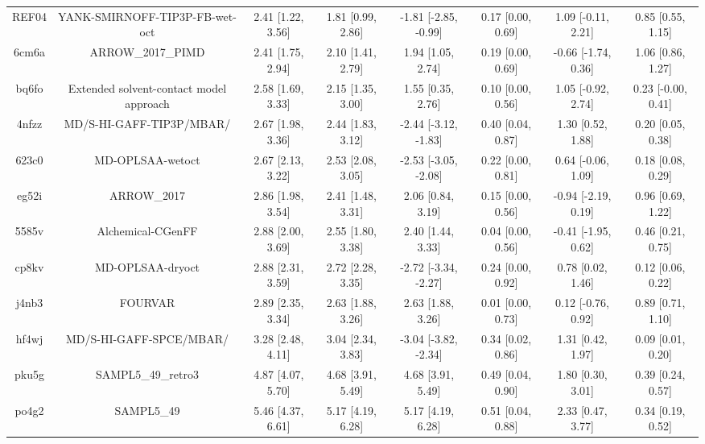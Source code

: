 \documentclass{article}
\begin{document}
\begin{center}
\begin{longtable}{|cccccccc|}
 REF04 &                     YANK-SMIRNOFF-TIP3P-FB-wet-oct &  2.41 [1.22, 3.56] &  1.81 [0.99, 2.86] &  -1.81 [-2.85, -0.99] &  0.17 [0.00, 0.69] &   1.09 [-0.11, 2.21] &     0.85 [0.55, 1.15] \\
 6cm6a &                                  ARROW\_2017\_PIMD &  2.41 [1.75, 2.94] &  2.10 [1.41, 2.79] &     1.94 [1.05, 2.74] &  0.19 [0.00, 0.69] &  -0.66 [-1.74, 0.36] &     1.06 [0.86, 1.27] \\
 bq6fo &            Extended solvent-contact model approach &  2.58 [1.69, 3.33] &  2.15 [1.35, 3.00] &     1.55 [0.35, 2.76] &  0.10 [0.00, 0.56] &   1.05 [-0.92, 2.74] &    0.23 [-0.00, 0.41] \\
 4nfzz &                           MD/S-HI-GAFF-TIP3P/MBAR/ &  2.67 [1.98, 3.36] &  2.44 [1.83, 3.12] &  -2.44 [-3.12, -1.83] &  0.40 [0.04, 0.87] &    1.30 [0.52, 1.88] &     0.20 [0.05, 0.38] \\
 623c0 &                                   MD-OPLSAA-wetoct &  2.67 [2.13, 3.22] &  2.53 [2.08, 3.05] &  -2.53 [-3.05, -2.08] &  0.22 [0.00, 0.81] &   0.64 [-0.06, 1.09] &     0.18 [0.08, 0.29] \\
 eg52i &                                        ARROW\_2017 &  2.86 [1.98, 3.54] &  2.41 [1.48, 3.31] &     2.06 [0.84, 3.19] &  0.15 [0.00, 0.56] &  -0.94 [-2.19, 0.19] &     0.96 [0.69, 1.22] \\
 5585v &                                  Alchemical-CGenFF &  2.88 [2.00, 3.69] &  2.55 [1.80, 3.38] &     2.40 [1.44, 3.33] &  0.04 [0.00, 0.56] &  -0.41 [-1.95, 0.62] &     0.46 [0.21, 0.75] \\
 cp8kv &                                   MD-OPLSAA-dryoct &  2.88 [2.31, 3.59] &  2.72 [2.28, 3.35] &  -2.72 [-3.34, -2.27] &  0.24 [0.00, 0.92] &    0.78 [0.02, 1.46] &     0.12 [0.06, 0.22] \\
 j4nb3 &                                            FOURVAR &  2.89 [2.35, 3.34] &  2.63 [1.88, 3.26] &     2.63 [1.88, 3.26] &  0.01 [0.00, 0.73] &   0.12 [-0.76, 0.92] &     0.89 [0.71, 1.10] \\
 hf4wj &                            MD/S-HI-GAFF-SPCE/MBAR/ &  3.28 [2.48, 4.11] &  3.04 [2.34, 3.83] &  -3.04 [-3.82, -2.34] &  0.34 [0.02, 0.86] &    1.31 [0.42, 1.97] &     0.09 [0.01, 0.20] \\
 pku5g &                                 SAMPL5\_49\_retro3 &  4.87 [4.07, 5.70] &  4.68 [3.91, 5.49] &     4.68 [3.91, 5.49] &  0.49 [0.04, 0.90] &    1.80 [0.30, 3.01] &     0.39 [0.24, 0.57] \\
 po4g2 &                                         SAMPL5\_49 &  5.46 [4.37, 6.61] &  5.17 [4.19, 6.28] &     5.17 [4.19, 6.28] &  0.51 [0.04, 0.88] &    2.33 [0.47, 3.77] &     0.34 [0.19, 0.52] \\
\end{longtable}
\end{center}
\end{document}
